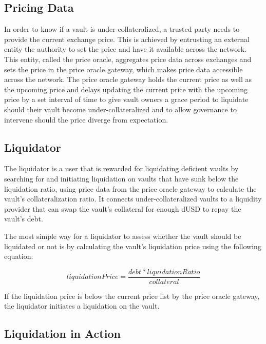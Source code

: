 \documentclass[12pt]{article}
\begin{document}
\subsection{Pricing Data}
In order to know if a vault is under-collateralized, a trusted party needs to provide the current exchange price. This is achieved by entrusting an external entity the authority to set the price and have it available across the network. This entity, called the price oracle, aggregates price data across exchanges and sets the price in the price oracle gateway, which makes price data accessible across the network. The price oracle gateway holds the current price as well as the upcoming price and delays updating the current price with the upcoming price by a set interval of time to give vault owners a grace period to liquidate should their vault become under-collateralized and to allow governance to intervene should the price diverge from expectation.

\subsection{Liquidator}

The liquidator is a user that is rewarded for liquidating deficient vaults by searching for and initiating liquidation on vaults that have sunk below the liquidation ratio, using price data from the price oracle gateway to calculate the vault's collateralization ratio. It connects under-collateralized vaults to a liquidity provider that can swap the vault's collateral for enough dUSD to repay the vault's debt.

The most simple way for a liquidator to assess whether the vault should be liquidated or not is by calculating the vault's liquidation price using the following equation:

\begin{equation*}
	liquidationPrice = \frac{debt * liquidationRatio}{collateral}
\end{equation*}

If the liquidation price is below the current price list by the price oracle gateway, the liquidator initiates a liquidation on the vault.

\subsection{Liquidation in Action}
\end{document}

